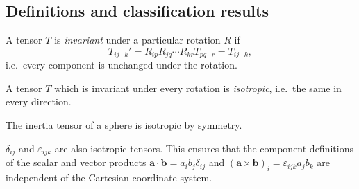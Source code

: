 \documentclass[a4paper]{article}
\begin{document}
\subsection{Definitions and classification results}
\begin{defi}
  A tensor $T$ is \emph{invariant} under a particular rotation $R$ if
  \[
    T_{ij\cdots k}' = R_{ip}R_{jq}\cdots R_{kr}T_{pq\cdots r} = T_{ij\cdots k},
  \]
  i.e.\ every component is unchanged under the rotation.

  A tensor $T$ which is invariant under every rotation is \emph{isotropic}, i.e.\ the same in every direction.
\end{defi}

\begin{eg}
  The inertia tensor of a sphere is isotropic by symmetry.

  $\delta_{ij}$ and $\varepsilon_{ijk}$ are also isotropic tensors. This ensures that the component definitions of the scalar and vector products $\mathbf{a}\cdot \mathbf{b} = a_i b_j \delta_{ij}$ and $(\mathbf{a}\times \mathbf{b})_i = \varepsilon_{ijk} a_j b_k$ are independent of the Cartesian coordinate system.
\end{eg}
\end{document}
